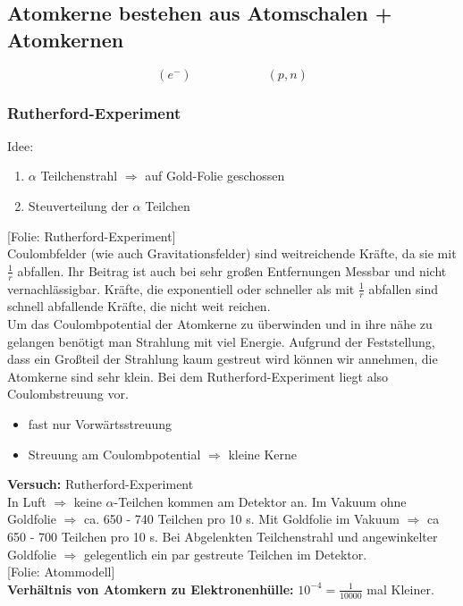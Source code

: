\documentclass[titlepage,11pt,a4paper,ngerman]{report}
\newcommand{\folie}[1]{\color{gray}[Folie: #1]\color{black}}
\newcommand{\versuch}[1]{\color{red!50!black} \textbf{Versuch:} \color{black} #1\\ }
\begin{document}
\subsection{Atomkerne bestehen aus Atomschalen + Atomkernen}

\begin{equation*}
(e^-) \qquad \qquad \qquad (p,n)
\end{equation*}

\subsubsection{Rutherford-Experiment}

Idee:
\begin{enumerate}[1)]
	\item $ \alpha $ Teilchenstrahl $ \Rightarrow $ auf Gold-Folie geschossen
	\item Steuverteilung der $ \alpha $ Teilchen
\end{enumerate}
\folie{Rutherford-Experiment}\\
Coulombfelder (wie auch Gravitationsfelder) sind weitreichende Kräfte, da sie mit $ \frac{1}{r} $ abfallen. Ihr Beitrag ist auch bei sehr großen Entfernungen Messbar und nicht vernachlässigbar. Kräfte, die exponentiell oder schneller als mit $ \frac{1}{r} $ abfallen sind schnell abfallende Kräfte, die nicht weit reichen.\\
Um das Coulombpotential der Atomkerne zu überwinden und in ihre nähe zu gelangen benötigt man Strahlung mit viel Energie. Aufgrund der Feststellung, dass ein Großteil der Strahlung kaum gestreut wird können wir annehmen, die Atomkerne sind sehr klein. Bei dem Rutherford-Experiment liegt also Coulombstreuung vor.
\begin{itemize}
	\item fast nur Vorwärtsstreuung
	\item Streuung am Coulombpotential $ \Rightarrow $ kleine Kerne
\end{itemize}
\versuch{Rutherford-Experiment}
In Luft $ \Rightarrow $ keine $ \alpha $-Teilchen kommen am Detektor an. Im Vakuum ohne Goldfolie $ \Rightarrow $ ca. 650 - 740 Teilchen pro 10 s. Mit Goldfolie im Vakuum $ \Rightarrow $ ca 650 - 700 Teilchen pro 10 s. Bei Abgelenkten Teilchenstrahl und angewinkelter Goldfolie $ \Rightarrow $ gelegentlich ein par gestreute Teilchen im Detektor.\\
\folie{Atommodell}\\
\textbf{Verhältnis von Atomkern zu Elektronenhülle:} $ 10^{-4} = \frac{1}{10000} $ mal Kleiner.
\end{document}
